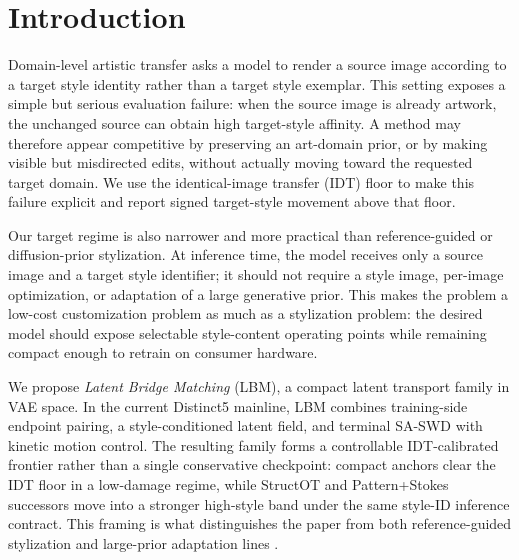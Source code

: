 \documentclass[letterpaper]{article}
\begin{document}
\section{Introduction}
Domain-level artistic transfer asks a model to render a source image according to a target style identity rather than a target style exemplar. This setting exposes a simple but serious evaluation failure: when the source image is already artwork, the unchanged source can obtain high target-style affinity. A method may therefore appear competitive by preserving an art-domain prior, or by making visible but misdirected edits, without actually moving toward the requested target domain. We use the identical-image transfer (IDT) floor to make this failure explicit and report signed target-style movement above that floor.

Our target regime is also narrower and more practical than reference-guided or diffusion-prior stylization. At inference time, the model receives only a source image and a target style identifier; it should not require a style image, per-image optimization, or adaptation of a large generative prior. This makes the problem a low-cost customization problem as much as a stylization problem: the desired model should expose selectable style-content operating points while remaining compact enough to retrain on consumer hardware.

We propose \emph{Latent Bridge Matching} (LBM), a compact latent transport family in VAE space. In the current Distinct5 mainline, LBM combines training-side endpoint pairing, a style-conditioned latent field, and terminal SA-SWD with kinetic motion control. The resulting family forms a controllable IDT-calibrated frontier rather than a single conservative checkpoint: compact anchors clear the IDT floor in a low-damage regime, while StructOT and Pattern+Stokes successors move into a stronger high-style band under the same style-ID inference contract. This framing is what distinguishes the paper from both reference-guided stylization and large-prior adaptation lines \cite{gatys2016image,huang2017adain,liu2024samst,liu2025samam,zhang2024artbank,chung2024styleid,zhou2024comprehensiveeval,yeh2020calibrated,wright2022artfid}.
\end{document}
